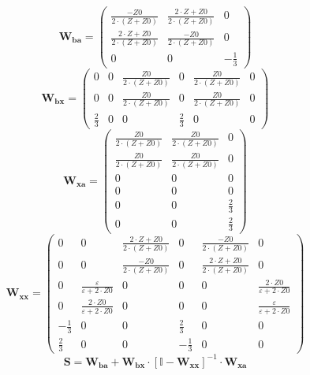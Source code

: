 \[ \mathbf{W_{ba}} = \left(\begin{array}{ccc} \frac{-Z0}{2\cdot
\left(Z+Z0\right)} & \frac{2\cdot Z+Z0}{2\cdot \left(Z+Z0\right)} & 0
\\ \frac{2\cdot Z+Z0}{2\cdot \left(Z+Z0\right)} & \frac{-Z0}{2\cdot
\left(Z+Z0\right)} & 0 \\ 0 & 0 & -\frac{1}{3} \end{array}\right) \]
\[ \mathbf{W_{bx}} = \left(\begin{array}{cccccc} 0 & 0 &
\frac{Z0}{2\cdot \left(Z+Z0\right)} & 0 & \frac{Z0}{2\cdot
\left(Z+Z0\right)} & 0 \\ 0 & 0 & \frac{Z0}{2\cdot \left(Z+Z0\right)}
& 0 & \frac{Z0}{2\cdot \left(Z+Z0\right)} & 0 \\ \frac{2}{3} & 0 & 0 &
\frac{2}{3} & 0 & 0 \end{array}\right) \]
\[ \mathbf{W_{xa}} = \left(\begin{array}{ccc} \frac{Z0}{2\cdot
\left(Z+Z0\right)} & \frac{Z0}{2\cdot \left(Z+Z0\right)} & 0 \\
\frac{Z0}{2\cdot \left(Z+Z0\right)} & \frac{Z0}{2\cdot
\left(Z+Z0\right)} & 0 \\ 0 & 0 & 0 \\ 0 & 0 & 0 \\ 0 & 0 &
\frac{2}{3} \\ 0 & 0 & \frac{2}{3} \end{array}\right) \]
\[ \mathbf{W_{xx}} = \left(\begin{array}{cccccc} 0 & 0 & \frac{2\cdot
Z+Z0}{2\cdot \left(Z+Z0\right)} & 0 & \frac{-Z0}{2\cdot
\left(Z+Z0\right)} & 0 \\ 0 & 0 & \frac{-Z0}{2\cdot \left(Z+Z0\right)}
& 0 & \frac{2\cdot Z+Z0}{2\cdot \left(Z+Z0\right)} & 0 \\ 0 &
\frac{\varepsilon}{\varepsilon+2\cdot Z0} & 0 & 0 & 0 & \frac{2\cdot
Z0}{\varepsilon+2\cdot Z0} \\ 0 & \frac{2\cdot Z0}{\varepsilon+2\cdot
Z0} & 0 & 0 & 0 & \frac{\varepsilon}{\varepsilon+2\cdot Z0} \\
-\frac{1}{3} & 0 & 0 & \frac{2}{3} & 0 & 0 \\ \frac{2}{3} & 0 & 0 &
-\frac{1}{3} & 0 & 0 \end{array}\right) \]
\[ \mathbf{S}=\mathbf{W_{ba}}+\mathbf{W_{bx}}\cdot\left[ \mathbb{I}
-\mathbf{W_{xx}}\right]^{-1}\cdot\mathbf{W_{xa}} \]
